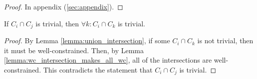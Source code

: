 \begin{proof}
In appendix (\ref{sec:appendix}).
\end{proof}



\begin{lemma}\label{lemma:uc_intersection_makes_all_uc}
If $C_i\cap C_j$ is trivial, then $\forall k: C_i\cap C_k$ is trivial.
\end{lemma}

\begin{proof}
By Lemma \ref{lemma:union_intersection}, if some $C_i\cap C_k$ is not trivial, then it must be well-constrained. Then, by Lemma \ref{lemma:wc_intersection_makes_all_wc}, all of the intersections are well-constrained. This contradicts the statement that $C_i\cap C_j$ is trivial.
\end{proof}











